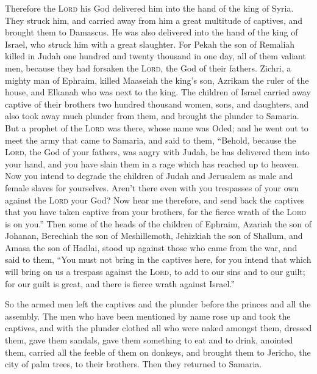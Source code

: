  Therefore the \textsc{Lord} his God delivered him into
the hand of the king of Syria. They struck him, and carried away from
him a great multitude of captives, and brought them to Damascus. He was
also delivered into the hand of the king of Israel, who struck him with
a great slaughter.  For Pekah the son of Remaliah killed
in Judah one hundred and twenty thousand in one day, all of them valiant
men, because they had forsaken the \textsc{Lord}, the God of their
fathers.  Zichri, a mighty man of Ephraim, killed Maaseiah
the king's son, Azrikam the ruler of the house, and Elkanah who was next
to the king.  The children of Israel carried away captive
of their brothers two hundred thousand women, sons, and daughters, and
also took away much plunder from them, and brought the plunder to
Samaria.  But a prophet of the \textsc{Lord} was there,
whose name was Oded; and he went out to meet the army that came to
Samaria, and said to them, ``Behold, because the \textsc{Lord}, the God
of your fathers, was angry with Judah, he has delivered them into your
hand, and you have slain them in a rage which has reached up to heaven.
 Now you intend to degrade the children of Judah and
Jerusalem as male and female slaves for yourselves. Aren't there even
with you trespasses of your own against the \textsc{Lord} your God?
 Now hear me therefore, and send back the captives that
you have taken captive from your brothers, for the fierce wrath of the
\textsc{Lord} is on you.''  Then some of the heads of the
children of Ephraim, Azariah the son of Johanan, Berechiah the son of
Meshillemoth, Jehizkiah the son of Shallum, and Amasa the son of Hadlai,
stood up against those who came from the war,  and said
to them, ``You must not bring in the captives here, for you intend that
which will bring on us a trespass against the \textsc{Lord}, to add to
our sins and to our guilt; for our guilt is great, and there is fierce
wrath against Israel.''

 So the armed men left the captives and the plunder
before the princes and all the assembly.  The men who
have been mentioned by name rose up and took the captives, and with the
plunder clothed all who were naked amongst them, dressed them, gave them
sandals, gave them something to eat and to drink, anointed them, carried
all the feeble of them on donkeys, and brought them to Jericho, the city
of palm trees, to their brothers. Then they returned to Samaria.

